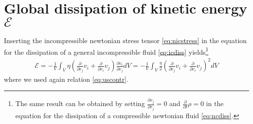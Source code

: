 \documentclass[a4paper,
					12pt,
					twoside,
					pagesize,
					cleardoubleplain,
					headsepline,
					bibtotoc
					]{scrbook}
\newcommand{\lra}[1]{{ \left( #1 \right) }}
\newcommand{\pd}[1]{\frac{\partial}{\partial #1}}
\newcommand{\ppd}[2]{\frac{\partial #2}{\partial #1}}
\begin{document}
\section{Global dissipation of kinetic energy $\mathcal{E}$}\label{nicdiss}
Inserting the incompressible newtonian stress tensor \eqref{eq:nicstress} 
in the equation for the dissipation of a general incompressible fluid
\ref{eq:icdiss} yields\footnote{The same result can be
obtained by setting $\ppd{r_j}{v_j}=0$ and $\pd{t}\rho=0$ in the equation for
the dissipation of a compressible newtonian fluid \eqref{eq:ncdiss}.}
\begin{align}
\mathcal{E} 
=-\frac{1}{V} \int_V  \eta\lra{\pd{r_j}v_i+\pd{r_i}v_j}\ppd{r_j}{v_i} dV
=-\frac{1}{V} \int_V \frac{\eta}{2}\lra{\pd{r_j}v_i+\pd{r_i}v_j}^2 dV
\end{align}
where we used again relation \ref{eq:uscontr}.
\end{document}
